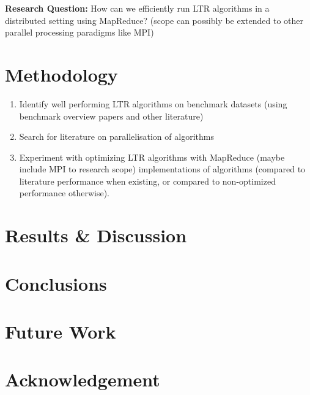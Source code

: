 \documentclass{sig-alternate-br}
\begin{document}
\textbf{Research Question:} How can we efficiently run LTR algorithms in a distributed setting using MapReduce? (scope can possibly be extended to other parallel processing paradigms like MPI)

\section{Methodology}
\begin{enumerate}
\item Identify well performing LTR algorithms on benchmark datasets (using benchmark overview papers and other literature)
\item Search for literature on parallelisation of algorithms
\item Experiment with optimizing LTR algorithms with MapReduce (maybe include MPI to research scope) implementations of algorithms (compared to literature performance when existing, or compared to non-optimized performance otherwise).
\end{enumerate}
\section{Results \& Discussion}
\section{Conclusions}
\section{Future Work}

\section{Acknowledgement}

%




\balancecolumns

\onecolumn
\end{document}
